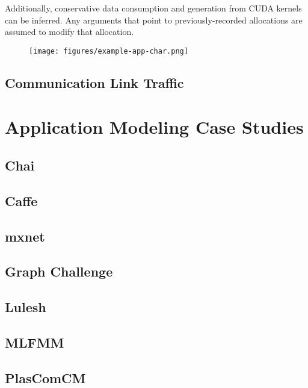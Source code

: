 Additionally, conservative data consumption and generation from CUDA kernels can be inferred.
Any arguments that point to previously-recorded allocations are assumed to modify that allocation.

\begin{figure}[ht]
    \centering
    \texttt{[image: figures/example-app-char.png]}
    \caption{}
    \label{fig:example-app-char}
\end{figure}


\subsection{Communication Link Traffic}



\section{Application Modeling Case Studies}
\subsection{Chai}
\subsection{Caffe}
\subsection{mxnet}
\subsection{Graph Challenge}
\subsection{Lulesh}
\subsection{MLFMM}
\subsection{PlasComCM}